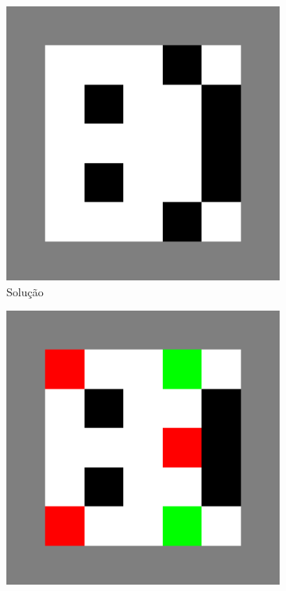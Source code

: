 \documentclass{article}
\begin{document}
\begin{figure}
    \centering
    \begin{subfigure}{0.3\textwidth}
        \centering
        \includegraphics[width=0.9\linewidth]{face-border}
        \caption{Solução}
    \end{subfigure}
    \begin{subfigure}{0.3\textwidth}
        \centering
        \includegraphics[width=0.9\linewidth]{face/evap005-it100/run1-diff-border}

\end{subfigure}
\end{figure}
\end{document}
